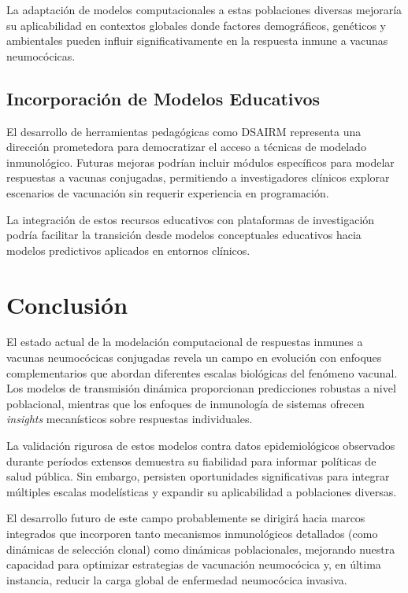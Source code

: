 La adaptación de modelos computacionales a estas poblaciones diversas mejoraría su aplicabilidad en contextos globales donde factores demográficos, genéticos y ambientales pueden influir significativamente en la respuesta inmune a vacunas neumocócicas.

\subsection{Incorporación de Modelos Educativos}

El desarrollo de herramientas pedagógicas como DSAIRM \cite{Handel2020} representa una dirección prometedora para democratizar el acceso a técnicas de modelado inmunológico. Futuras mejoras podrían incluir módulos específicos para modelar respuestas a vacunas conjugadas, permitiendo a investigadores clínicos explorar escenarios de vacunación sin requerir experiencia en programación.

La integración de estos recursos educativos con plataformas de investigación podría facilitar la transición desde modelos conceptuales educativos hacia modelos predictivos aplicados en entornos clínicos.

\section{Conclusión}

El estado actual de la modelación computacional de respuestas inmunes a vacunas neumocócicas conjugadas revela un campo en evolución con enfoques complementarios que abordan diferentes escalas biológicas del fenómeno vacunal. Los modelos de transmisión dinámica proporcionan predicciones robustas a nivel poblacional, mientras que los enfoques de inmunología de sistemas ofrecen \textit{insights} mecanísticos sobre respuestas individuales.

La validación rigurosa de estos modelos contra datos epidemiológicos observados durante períodos extensos demuestra su fiabilidad para informar políticas de salud pública. Sin embargo, persisten oportunidades significativas para integrar múltiples escalas modelísticas y expandir su aplicabilidad a poblaciones diversas.

El desarrollo futuro de este campo probablemente se dirigirá hacia marcos integrados que incorporen tanto mecanismos inmunológicos detallados (como dinámicas de selección clonal) como dinámicas poblacionales, mejorando nuestra capacidad para optimizar estrategias de vacunación neumocócica y, en última instancia, reducir la carga global de enfermedad neumocócica invasiva.